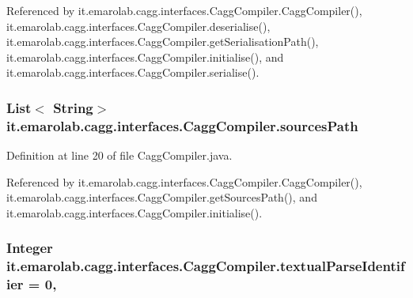 Referenced by it.\-emarolab.\-cagg.\-interfaces.\-Cagg\-Compiler.\-Cagg\-Compiler(), it.\-emarolab.\-cagg.\-interfaces.\-Cagg\-Compiler.\-deserialise(), it.\-emarolab.\-cagg.\-interfaces.\-Cagg\-Compiler.\-get\-Serialisation\-Path(), it.\-emarolab.\-cagg.\-interfaces.\-Cagg\-Compiler.\-initialise(), and it.\-emarolab.\-cagg.\-interfaces.\-Cagg\-Compiler.\-serialise().

\hypertarget{classit_1_1emarolab_1_1cagg_1_1interfaces_1_1CaggCompiler_aaf15dc18fa5f445c633ccd5918e236ed}{
\subsubsection[{sources\-Path}]{\setlength{\rightskip}{0pt plus 5cm}List$<$ String$>$ it.\-emarolab.\-cagg.\-interfaces.\-Cagg\-Compiler.\-sources\-Path\hspace{0.3cm}{\ttfamily [private]}}}\label{classit_1_1emarolab_1_1cagg_1_1interfaces_1_1CaggCompiler_aaf15dc18fa5f445c633ccd5918e236ed}


Definition at line 20 of file Cagg\-Compiler.\-java.



Referenced by it.\-emarolab.\-cagg.\-interfaces.\-Cagg\-Compiler.\-Cagg\-Compiler(), it.\-emarolab.\-cagg.\-interfaces.\-Cagg\-Compiler.\-get\-Sources\-Path(), and it.\-emarolab.\-cagg.\-interfaces.\-Cagg\-Compiler.\-initialise().

\hypertarget{classit_1_1emarolab_1_1cagg_1_1interfaces_1_1CaggCompiler_a14b67e28d48cf1f8a746404690b07950}{
\subsubsection[{textual\-Parse\-Identifier}]{\setlength{\rightskip}{0pt plus 5cm}Integer it.\-emarolab.\-cagg.\-interfaces.\-Cagg\-Compiler.\-textual\-Parse\-Identifier = 0\hspace{0.3cm}{\ttfamily [static]}, {\ttfamily [private]}}}\label{classit_1_1emarolab_1_1cagg_1_1interfaces_1_1CaggCompiler_a14b67e28d48cf1f8a746404690b07950}


